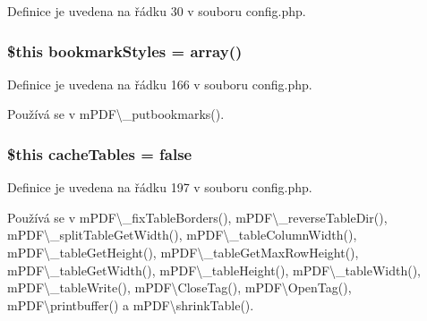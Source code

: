 Definice je uvedena na řádku 30 v souboru config.\-php.

\hypertarget{config_8php_acd1103127437498842ed659057cd8c62}{
\subsubsection[{bookmark\-Styles}]{\setlength{\rightskip}{0pt plus 5cm}\$this bookmark\-Styles = array()}}\label{config_8php_acd1103127437498842ed659057cd8c62}


Definice je uvedena na řádku 166 v souboru config.\-php.



Používá se v m\-P\-D\-F\textbackslash{}\-\_\-putbookmarks().

\hypertarget{config_8php_a8cc2276fbb1a71fc15a2f7c62a56bb34}{
\subsubsection[{cache\-Tables}]{\setlength{\rightskip}{0pt plus 5cm}\$this cache\-Tables = {\bf false}}}\label{config_8php_a8cc2276fbb1a71fc15a2f7c62a56bb34}


Definice je uvedena na řádku 197 v souboru config.\-php.



Používá se v m\-P\-D\-F\textbackslash{}\-\_\-fix\-Table\-Borders(), m\-P\-D\-F\textbackslash{}\-\_\-reverse\-Table\-Dir(), m\-P\-D\-F\textbackslash{}\-\_\-split\-Table\-Get\-Width(), m\-P\-D\-F\textbackslash{}\-\_\-table\-Column\-Width(), m\-P\-D\-F\textbackslash{}\-\_\-table\-Get\-Height(), m\-P\-D\-F\textbackslash{}\-\_\-table\-Get\-Max\-Row\-Height(), m\-P\-D\-F\textbackslash{}\-\_\-table\-Get\-Width(), m\-P\-D\-F\textbackslash{}\-\_\-table\-Height(), m\-P\-D\-F\textbackslash{}\-\_\-table\-Width(), m\-P\-D\-F\textbackslash{}\-\_\-table\-Write(), m\-P\-D\-F\textbackslash{}\-Close\-Tag(), m\-P\-D\-F\textbackslash{}\-Open\-Tag(), m\-P\-D\-F\textbackslash{}printbuffer() a m\-P\-D\-F\textbackslash{}shrink\-Table().

